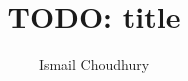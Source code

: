 \documentclass[12pt]{third-rep}
\title{TODO: title}
\author{Ismail Choudhury}
\begin{document}
\dotitleandabstract

\tableofcontents
\listoffigures
\listoftables










 

\appendix

\end{document}
